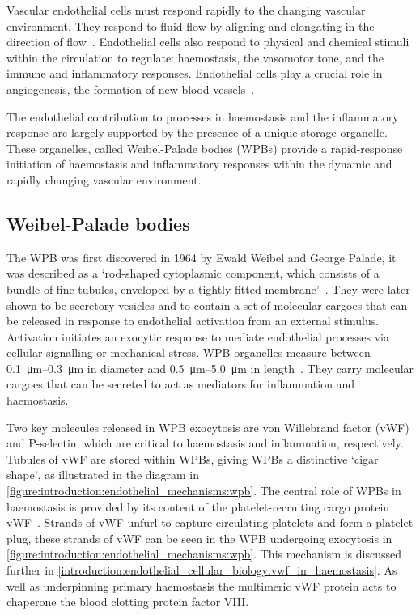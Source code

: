 Vascular endothelial cells must respond rapidly to the changing vascular environment. They respond to fluid flow by aligning and elongating in the direction of flow~\cite{Eskin1984}. Endothelial cells also respond to physical and chemical stimuli within the circulation to regulate: haemostasis, the vasomotor tone, and the immune and inflammatory responses. Endothelial cells play a crucial role in angiogenesis, the formation of new blood vessels~\cite{Sumpio2002}.

The endothelial contribution to processes in haemostasis and the inflammatory response are largely supported by the presence of a unique storage organelle. These organelles, called Weibel-Palade bodies (WPBs) provide a rapid-response initiation of haemostasis and inflammatory responses within the dynamic and rapidly changing vascular environment.

\subsection{Weibel-Palade bodies}
\label{introduction:endothelial_cellular_biology:wpb}
The WPB was first discovered in 1964 by Ewald Weibel and George Palade, it was described as a `rod-shaped cytoplasmic component, which consists of a bundle of fine tubules, enveloped by a tightly fitted membrane'~\cite{Weibel1964}. They were later shown to be secretory vesicles and to contain a set of molecular cargoes that can be released in response to endothelial activation from an external stimulus. Activation initiates an exocytic response to mediate endothelial processes via cellular signalling or mechanical stress. WPB organelles measure between \SIrange{0.1}{0.3}{\micro\meter} in diameter and \SIrange{0.5}{5.0}{\micro\meter} in length~\cite{Ferraro2014}. They carry molecular cargoes that can be secreted to act as  mediators for inflammation and haemostasis.

Two key molecules released in WPB exocytosis are von Willebrand factor (vWF) and P-selectin, which are critical to haemostasis and inflammation, respectively. Tubules of vWF are stored within WPBs, giving WPBs a distinctive `cigar shape', as illustrated in the diagram in \autoref{figure:introduction:endothelial_mechanisms:wpb}. The central role of WPBs in haemostasis is provided by its content of the platelet-recruiting cargo protein vWF~\cite{Wagner1982}. Strands of vWF unfurl to capture circulating platelets and form a platelet plug, these strands of vWF can be seen in the WPB undergoing exocytosis in \autoref{figure:introduction:endothelial_mechanisms:wpb}. This mechanism is discussed further in \autoref{introduction:endothelial_cellular_biology:vwf_in_haemostasis}. As well as underpinning primary haemostasis the multimeric vWF protein acts to chaperone the blood clotting protein factor VIII.

